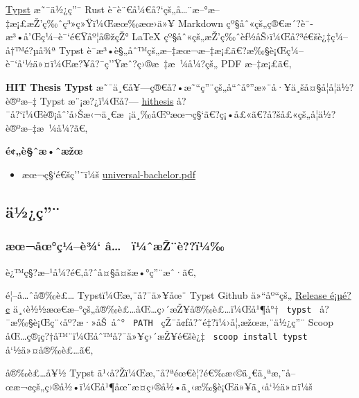 \href{https://typst.app/}{Typst} æ˜¯ä½¿ç''¨ Rust
è¯­è¨€å¼€å?{}`çš„å\ldots¨æ--°æ--‡æ¡£æŽ'ç‰ˆç³»ç»Ÿï¼Œæœ‰æœ›ä»¥ Markdown
çº§åˆ«çš„ç®€æ´?è¯­æ³•å'Œç¼--è¯`é€Ÿåº¦å®žçŽ° LaTeX
çº§åˆ«çš„æŽ'ç‰ˆèƒ½åŠ›ï¼Œå?³é€šè¿‡ç¼--å†™é?µå¾ª Typst
è¯­æ³•è§„åˆ™çš„æ--‡æœ¬æ--‡æ¡£ã€?æ‰§è¡Œç¼--è¯`å`½ä»¤ï¼Œæ?¥å?¯ç''Ÿæˆ?ç›®æ~‡æ~¼å¼?çš„
PDF æ--‡æ¡£ã€‚

\textbf{HIT Thesis Typst}
æ˜¯ä¸€å¥---ç®€å?•æ˜``ç''¨çš„å``ˆå°''æ»¨å·¥ä¸šå¤§å­¦å­¦ä½?è®ºæ--‡ Typst
æ¨¡æ?¿ï¼Œå?--- \href{https://github.com/hithesis/hithesis}{hithesis}
å?¯å?{}`ï¼Œè®¡åˆ'å›Šæ‹¬ä¸€æ~¡ä¸‰åŒºæœ¬ç§`ã€?ç¡•å£«ã€?å?šå£«çš„å­¦ä½?è®ºæ--‡æ~¼å¼?ã€‚

\textbf{é¢„è§ˆæ•ˆæžœ}

\begin{itemize}
\tightlist
\item
  æœ¬ç§`é€šç''¨ï¼š
  \href{https://github.com/chosertech/HIT-Thesis-Typst/blob/build/universal-bachelor.pdf}{universal-bachelor.pdf}
\end{itemize}

\subsection{ä½¿ç''¨}\label{uxe4uxbduxe7}

\subsubsection{æœ¬åœ°ç¼--è¾` â\ldots~
ï¼ˆæŽ¨è??ï¼‰}\label{uxe6ux153uxe5ux153uxe7uxbcuxe8uxbe-uxe2-uxefuxbcux2c6uxe6ux17euxe8uxefuxbc}

è¿™ç§?æ--¹å¼?é€‚å?ˆå¤§å¤šæ•°ç''¨æˆ·ã€‚

é¦--å\ldots ˆå®‰è£\ldots{} Typstï¼Œæ‚¨å?¯ä»¥åœ¨ Typst Github ä»``åº``çš„
\href{https://github.com/typst/typst/releases/}{Release é¡µé?¢}
ä¸‹è½½æœ€æ--°çš„å®‰è£\ldots åŒ\ldots ç›´æŽ¥å®‰è£\ldots ï¼Œå¹¶å°†
\texttt{\ typst\ } å?¯æ‰§è¡Œç¨‹åº?æ·»åŠ~åˆ° \texttt{\ PATH\ }
çŽ¯å¢ƒå?˜é‡?ï¼›å¦‚æžœæ‚¨ä½¿ç''¨ Scoop
åŒ\ldots ç®¡ç?†å™¨ï¼Œåˆ™å?¯ä»¥ç›´æŽ¥é€šè¿‡
\texttt{\ scoop\ install\ typst\ } å`½ä»¤å®‰è£\ldots ã€‚

å®‰è£\ldots å¥½ Typst
ä¹‹å?Žï¼Œæ‚¨å?ªéœ€è¦?é€‰æ‹©ä¸€ä¸ªæ‚¨å--œæ¬¢çš„ç›®å½•ï¼Œå¹¶åœ¨æ­¤ç›®å½•ä¸‹æ‰§è¡Œä»¥ä¸‹å`½ä»¤ï¼š

\begin{Shaded}
\begin{Highlighting}[]
\end{Highlighting}
\end{Shaded}

